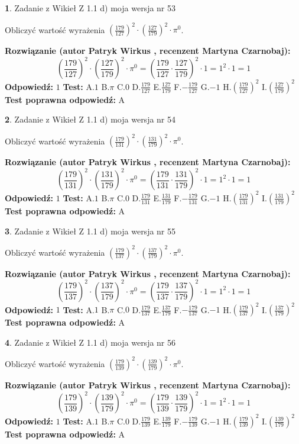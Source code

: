 \documentclass[12pt, a4paper]{article}
\theoremstyle{definition} %
\newtheorem{zad}{}
\newcommand{\zadStart}[1]{\begin{zad}#1\newline}
\newcommand{\zadStop}{\end{zad}}
\newcommand{\rozwStart}[2]{\noindent \textbf{Rozwiązanie (autor #1 , recenzent #2): }\newline}
\newcommand{\rozwStop}{\newline}
\newcommand{\odpStart}{\noindent \textbf{Odpowiedź:}\newline}
\newcommand{\odpStop}{\newline}
\newcommand{\testStart}{\noindent \textbf{Test:}\newline}
\newcommand{\testStop}{\newline}
\newcommand{\kluczStart}{\noindent \textbf{Test poprawna odpowiedź:}\newline}
\newcommand{\kluczStop}{\newline}
\begin{document}
\zadStart{Zadanie z Wikieł Z 1.1 d) moja wersja nr 53}

Obliczyć wartość wyrażenia $(\frac{179}{127})^{2} \cdot (\frac{127}{179})^{2} \cdot \pi^{0}$.
\zadStop
\rozwStart{Patryk Wirkus}{Martyna Czarnobaj}
$$(\frac{179}{127})^{2} \cdot (\frac{127}{179})^{2} \cdot \pi^{0} = (\frac{179}{127} \cdot \frac{127}{179})^{2} \cdot 1 = 1^{2} \cdot 1 = 1$$
\rozwStop
\odpStart
$1$
\odpStop
\testStart
A.$1$ B.$\pi$ C.$0$ D.$\frac{179}{127}$ E.$\frac{127}{179}$
F.$-\frac{179}{127}$ G.$-1$
H.$(\frac{179}{127})^{2}$
I.$(\frac{127}{179})^{2}$
\testStop
\kluczStart
A
\kluczStop



\zadStart{Zadanie z Wikieł Z 1.1 d) moja wersja nr 54}

Obliczyć wartość wyrażenia $(\frac{179}{131})^{2} \cdot (\frac{131}{179})^{2} \cdot \pi^{0}$.
\zadStop
\rozwStart{Patryk Wirkus}{Martyna Czarnobaj}
$$(\frac{179}{131})^{2} \cdot (\frac{131}{179})^{2} \cdot \pi^{0} = (\frac{179}{131} \cdot \frac{131}{179})^{2} \cdot 1 = 1^{2} \cdot 1 = 1$$
\rozwStop
\odpStart
$1$
\odpStop
\testStart
A.$1$ B.$\pi$ C.$0$ D.$\frac{179}{131}$ E.$\frac{131}{179}$
F.$-\frac{179}{131}$ G.$-1$
H.$(\frac{179}{131})^{2}$
I.$(\frac{131}{179})^{2}$
\testStop
\kluczStart
A
\kluczStop



\zadStart{Zadanie z Wikieł Z 1.1 d) moja wersja nr 55}

Obliczyć wartość wyrażenia $(\frac{179}{137})^{2} \cdot (\frac{137}{179})^{2} \cdot \pi^{0}$.
\zadStop
\rozwStart{Patryk Wirkus}{Martyna Czarnobaj}
$$(\frac{179}{137})^{2} \cdot (\frac{137}{179})^{2} \cdot \pi^{0} = (\frac{179}{137} \cdot \frac{137}{179})^{2} \cdot 1 = 1^{2} \cdot 1 = 1$$
\rozwStop
\odpStart
$1$
\odpStop
\testStart
A.$1$ B.$\pi$ C.$0$ D.$\frac{179}{137}$ E.$\frac{137}{179}$
F.$-\frac{179}{137}$ G.$-1$
H.$(\frac{179}{137})^{2}$
I.$(\frac{137}{179})^{2}$
\testStop
\kluczStart
A
\kluczStop



\zadStart{Zadanie z Wikieł Z 1.1 d) moja wersja nr 56}

Obliczyć wartość wyrażenia $(\frac{179}{139})^{2} \cdot (\frac{139}{179})^{2} \cdot \pi^{0}$.
\zadStop
\rozwStart{Patryk Wirkus}{Martyna Czarnobaj}
$$(\frac{179}{139})^{2} \cdot (\frac{139}{179})^{2} \cdot \pi^{0} = (\frac{179}{139} \cdot \frac{139}{179})^{2} \cdot 1 = 1^{2} \cdot 1 = 1$$
\rozwStop
\odpStart
$1$
\odpStop
\testStart
A.$1$ B.$\pi$ C.$0$ D.$\frac{179}{139}$ E.$\frac{139}{179}$
F.$-\frac{179}{139}$ G.$-1$
H.$(\frac{179}{139})^{2}$
I.$(\frac{139}{179})^{2}$
\testStop
\kluczStart
A
\kluczStop
\end{document}
